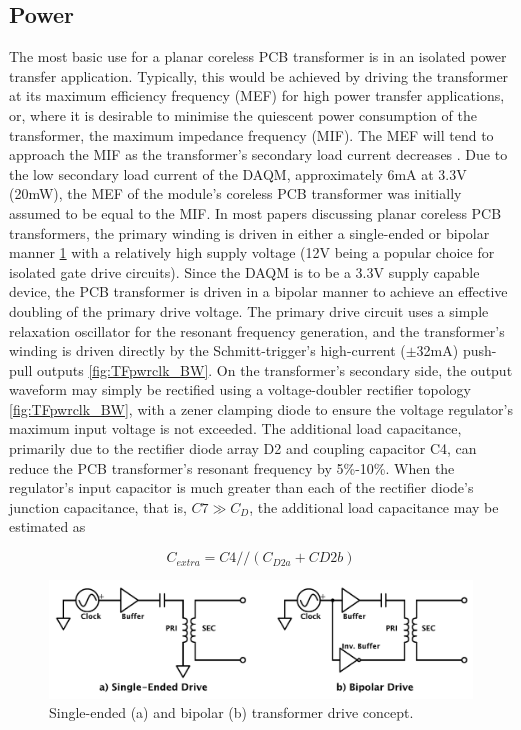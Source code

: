 \documentclass[conference]{IEEEtran}
\begin{document}
	\subsection{Power}
	The most basic use for a planar coreless PCB transformer is in an isolated power transfer application.  Typically, this would be achieved by driving the transformer at its maximum efficiency frequency (MEF) for high power transfer applications, or, where it is desirable to minimise the quiescent power consumption of the transformer, the maximum impedance frequency (MIF).  The MEF will tend to approach the MIF as the transformer's secondary load current decreases \cite{TangHuiFundamental}.  
	Due to the low secondary load current of the DAQM, approximately 6mA at 3.3V (20mW), the MEF of the module's coreless PCB transformer was initially assumed to be equal to the MIF.  In most papers discussing planar coreless PCB transformers, the primary winding is driven in either a single-ended or bipolar manner \ref{fig:BIvsSE} with a relatively high supply voltage (12V being a popular choice for isolated gate drive circuits).  Since the DAQM is to be a 3.3V supply capable device, the PCB transformer is driven in a bipolar manner to achieve an effective doubling of the primary drive voltage.  The primary drive circuit uses a simple relaxation oscillator for the resonant frequency generation, and the transformer's winding is driven directly by the Schmitt-trigger's high-current ($ \pm $32mA) push-pull outputs \ref{fig:TFpwrclk_BW}.
	On the transformer's secondary side, the output waveform may simply be rectified using a voltage-doubler rectifier topology \ref{fig:TFpwrclk_BW}, with a zener clamping diode to ensure the voltage regulator's maximum input voltage is not exceeded.  The additional load capacitance, primarily due to the rectifier diode array D2 and coupling capacitor C4, can reduce the PCB transformer's resonant frequency by 5\%-10\%.  When the regulator's input capacitor is much greater than each of the rectifier diode's junction capacitance, that is, $ C7 \gg C_{D}$, the additional load capacitance may be estimated as 
	 
	\begin{equation*}
		C_{extra} = C4 // (C_{D2a}+C{D2b})
	\end{equation*}
	
	\begin{figure}[t]
		\centering
		\includegraphics[width=0.6\columnwidth]{./img/BIvsSE}
		\caption{Single-ended (a) and bipolar (b) transformer drive concept.}
		\label{fig:BIvsSE}
	\end{figure}
	
\end{document}
